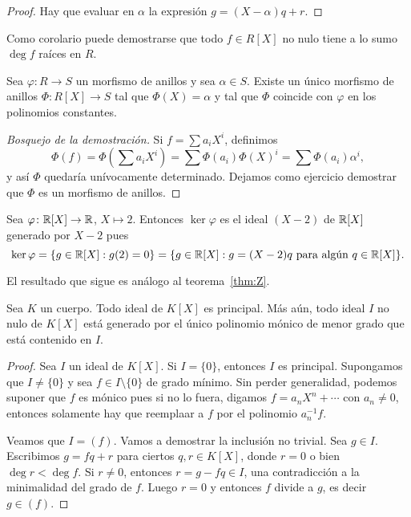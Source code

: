 \begin{proof}
Hay que evaluar en $\alpha$ la expresión $g=(X-\alpha)q+r$. 	
\end{proof}

Como corolario puede demostrarse que 
todo $f\in R[X]$ no nulo tiene a lo sumo $\deg f$ raíces en $R$. 

\begin{proposition}
\label{pro:polinomios}
Sea $\varphi\colon R\to S$ un morfismo de anillos y sea $\alpha\in S$. Existe un único morfismo de anillos $\Phi\colon R[X]\to S$ 
tal que $\Phi(X)=\alpha$ y tal que $\Phi$ coincide con $\varphi$ en los polinomios constantes.  	
\end{proposition}

\begin{proof}[Bosquejo de la demostración]
Si $f=\sum a_iX^i$, definimos 
\[
\Phi(f)=\Phi(\sum a_iX^i)=\sum\Phi(a_i)\Phi(X)^i=\sum\Phi(a_i)\alpha^i,
\] 	
y así $\Phi$ quedaría unívocamente determinado. Dejamos como ejercicio demostrar que $\Phi$ es un morfismo de anillos. 
\end{proof}

\begin{example}
Sea $\varphi\colon\mathbb{R}[X]\to\mathbb{R}$, $X\mapsto 2$. Entonces $\ker\varphi$ es el ideal   
$(X-2)$ de $\mathbb{R}[X]$ generado por $X-2$ pues 
\[
\ker\varphi=\{g\in\mathbb{R}[X]:g(2)=0\}
=\{g\in\mathbb{R}[X]:g=(X-2)q\text{ para algún $q\in\mathbb{R}[X]$}\}.
\] 	
\end{example}

El resultado que sigue es análogo al teorema~\ref{thm:Z}.

\begin{theorem}
Sea $K$ un cuerpo. Todo ideal de $K[X]$ es principal. Más aún, todo ideal $I$ no nulo de $K[X]$
está generado por el único polinomio mónico de menor grado que está contenido en $I$.  	
\end{theorem}

\begin{proof}
	Sea $I$ un ideal de $K[X]$. Si $I=\{0\}$, entonces $I$ es principal. Supongamos que $I\ne\{0\}$ 
	y sea $f\in I\setminus\{0\}$ de grado mínimo. Sin perder generalidad, podemos suponer que $f$ es mónico pues
	si no lo fuera, digamos $f=a_nX^n+\cdots$ con $a_n\ne 0$, entonces solamente hay que reemplaar a $f$ 
	por el polinomio $a_n^{-1}f$. 
	
	Veamos que $I=(f)$. Vamos a demostrar la inclusión no trivial. Sea $g\in I$. Escribimos
	$g=fq+r$ para ciertos $q,r\in K[X]$, donde $r=0$ o bien $\deg r<\deg f$. Si $r\ne 0$, entonces $r=g-fq\in I$, 
	una contradicción a la minimalidad del grado de $f$. Luego $r=0$ y entonces $f$ divide a $g$, es decir
	$g\in (f)$.   
\end{proof}


